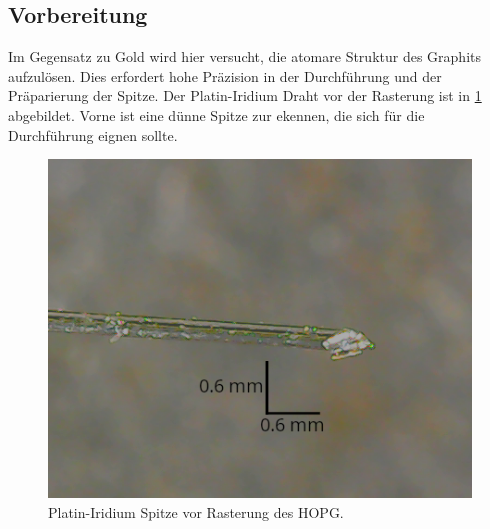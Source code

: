 \subsection*{Vorbereitung}
Im Gegensatz zu Gold wird hier versucht, die atomare Struktur des Graphits aufzulösen. 
Dies erfordert hohe Präzision in der Durchführung und der Präparierung der Spitze. Der Platin-Iridium Draht
vor der Rasterung ist in \cref{fig:spitze_hopg_vorher_v2} abgebildet. Vorne ist eine dünne Spitze zur ekennen,
die sich für die Durchführung eignen sollte.

\begin{figure}[htb]
    \centering
    \includegraphics[width=0.5\linewidth]{figs/spitze_hopg_vorher_v2.png}
    \caption{Platin-Iridium Spitze vor Rasterung des HOPG.}
    \label{fig:spitze_hopg_vorher_v2}
\end{figure}

